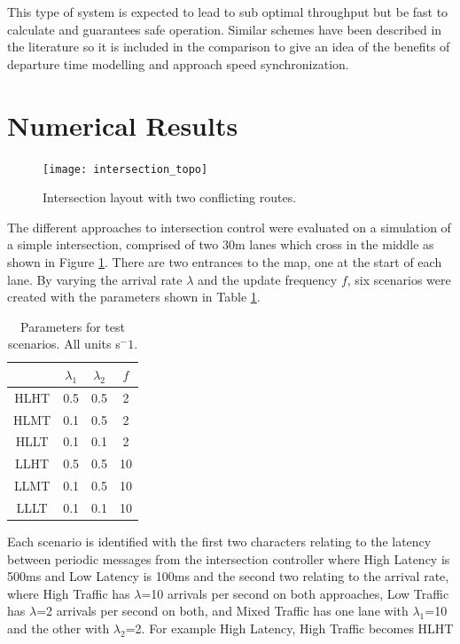 This type of system is expected to lead to sub optimal throughput but be fast to calculate and guarantees safe operation. Similar schemes have been described in the literature so it is included in the comparison to give an idea of the benefits of departure time modelling and approach speed synchronization. 

\section{Numerical Results}

\begin{figure}[ht]
\centering
\texttt{[image: intersection\_topo]}
\caption{Intersection layout with two conflicting routes.}
\label{fig:intersection_topo}
\end{figure}

The different approaches to intersection control were evaluated on a simulation of a simple intersection, comprised of two 30m lanes which cross in the middle as shown in Figure \ref{fig:intersection_topo}. There are two entrances to the map, one at the start of each lane. By varying the arrival rate $\lambda$ and the update frequency $f$, six scenarios were created with the parameters shown in Table \ref{tab:params}.
\begin{table}
\begin{tabular}{|c|c|c|c|}
\hline
	& $\lambda_1$ & $\lambda_2$ & $f$ \\
\hline
HLHT & 0.5 & 0.5 & 2 \\
HLMT & 0.1 & 0.5 & 2 \\
HLLT & 0.1 & 0.1 & 2 \\
LLHT & 0.5 & 0.5 & 10 \\
LLMT & 0.1 & 0.5 & 10 \\
LLLT & 0.1 & 0.1 & 10 \\
\hline
\end{tabular}
\label{tab:params}
\caption{Parameters for test scenarios. All units s$^-1$. }
\end{table}

Each scenario is identified with the first two characters relating to the latency between periodic messages from the intersection controller where High Latency is 500ms and  Low Latency is 100ms and the second two relating to the arrival rate, where High Traffic has $\lambda$=10 arrivals per second on both approaches, Low Traffic has $\lambda$=2 arrivals per second on both, and Mixed Traffic has one lane with $\lambda_1$=10 and the other with $\lambda_2$=2. For example High Latency, High Traffic becomes HLHT

